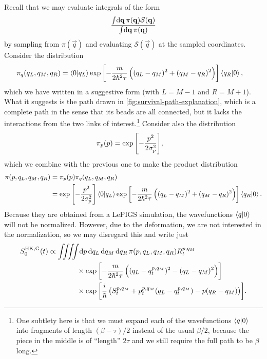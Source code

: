 Recall that we may evaluate integrals of the form
\begin{align}
	\frac{
			\int\! \dif \vec{q} \, \pi(\vec{q}) \mathcal{S}(\vec{q})
		}{
			\int\! \dif \vec{q} \, \pi(\vec{q})
		}
\end{align}
by sampling from $\pi(\vec{q})$ and evaluating $\mathcal{S}(\vec{q})$ at the sampled coordinates.
Consider the distribution
\begin{align}
	\pi_q(q_L, q_M, q_R)
	&= \braket{0 | q_L} \exp{\left[ -\frac{m}{2 \hbar^2 \tau} \left( (q_L- q_M)^2 + (q_M- q_R)^2 \right) \right]} \braket{q_R | 0},
		\label{eq:hk-dist-q}
\end{align}
which we have written in a suggestive form (with $L = M - 1$ and $R = M + 1$).
What it suggests is the path drawn in \cref{fig:survival-path-explanation}, which is a complete path in the sense that its beads are all connected, but it lacks the interactions from the two links of interest.\footnote{
	One subtlety here is that we must expand each of the wavefunctions $\braket{q | 0}$ into fragments of length $(\beta - \tau) / 2$ instead of the usual $\beta / 2$, because the piece in the middle is of ``length'' $2 \tau$ and we still require the full path to be $\beta$ long.
}
Consider also the distribution
\begin{align}
	\pi_p(p)
	&= \exp{\left[ -\frac{p^2}{2 \sigma_p^2} \right]},
\end{align}
which we combine with the previous one to make the product distribution
\begin{subequations}
\begin{align}
	\pi(p, q_L, q_M, q_R)
	&= \pi_p(p) \pi_q(q_L, q_M, q_R) \\
	&= \exp{\left[ -\frac{p^2}{2 \sigma_p^2} \right]}
		\braket{0 | q_L} \exp{\left[ -\frac{m}{2 \hbar^2 \tau} \left( (q_L- q_M)^2 + (q_M- q_R)^2 \right) \right]} \braket{q_R | 0}.
\end{align}
\end{subequations}
Because they are obtained from a LePIGS simulation, the wavefunctions $\braket{q | 0}$ will not be normalized.
However, due to the deformation, we are not interested in the normalization, so we may disregard this and write just
\begin{align}
	S_0\hkg(t)
	&\propto \iiiint\! \dif p \dif q\LL \dif q\MM \dif q\RR \,
			\pi(p, q\LL, q\MM, q\RR) R\coh{p}{q\MM}_t \notag \\
	&\qquad\qquad\times
			\expb{-\frac{m}{2 \hbar^2 \tau} \left( (q\LL - q\coh{p}{q\MM}_t)^2 - (q\LL - q\MM)^2 \right)} \notag \\
	&\qquad\qquad\times
			\expb{\frac{i}{\hbar} \left( S\coh{p}{q\MM}_t + p\coh{p}{q\MM}_t (q\LL - q\coh{p}{q\MM}_t) - p (q\RR - q\MM) \right)}.
\end{align}
